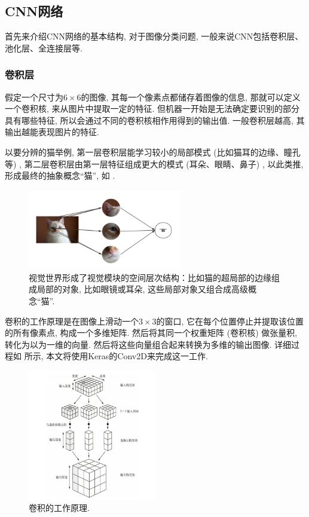 \documentclass[lang=cn,11pt]{elegantpaper}
\begin{document}
\subsection{CNN网络}
首先来介绍CNN网络的基本结构, 对于图像分类问题, 一般来说CNN包括卷积层、池化层、全连接层等. 
\subsubsection*{卷积层}
假定一个尺寸为$6\times 6$的图像, 其每一个像素点都储存着图像的信息, 那就可以定义一个卷积核, 来从图片中提取一定的特征. 但机器一开始是无法确定要识别的部分具有哪些特征, 所以会通过不同的卷积核相作用得到的输出值. 一般卷积层越高, 其输出越能表现图片的特征. 

以要分辨的猫举例, 第一层卷积层能学习较小的局部模式 (比如猫耳的边缘、瞳孔等) , 第二层卷积层由第一层特征组成更大的模式 (耳朵、眼睛、鼻子) , 以此类推, 形成最终的抽象概念“猫”, 如 . 
\tiny
\begin{figure}[htbp]
	\centering
  \includegraphics[width=0.6\textwidth]{cat1}
  \caption{视觉世界形成了视觉模块的空间层次结构：比如猫的超局部的边缘组成局部的对象, 比如眼镜或耳朵, 这些局部对象又组合成高级概念“猫”.\label{fig:cat1}}
\end{figure}

\normalsize
卷积的工作原理是在图像上滑动一个$3\times 3$的窗口, 它在每个位置停止并提取该位置的所有像素点, 构成一个多维矩阵. 然后将其同一个权重矩阵 (卷积核) 做张量积, 转化为以为一维的向量. 然后将这些向量组合起来转换为多维的输出图像. 详细过程如  所示, 本文将使用Keras的Conv2D来完成这一工作. 
\begin{figure}[hbtp]
	\centering
  \includegraphics[width=0.5\textwidth]{conv1.png}
  \caption{卷积的工作原理.\label{fig:conv1}}
\end{figure}
\end{document}
